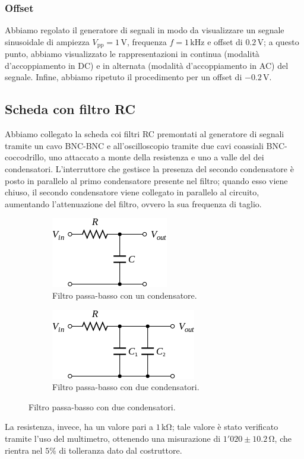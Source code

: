 \documentclass{article}
\begin{document}
			\subsubsection{Offset}
				Abbiamo regolato il generatore di segnali in modo da visualizzare un segnale sinusoidale di ampiezza $ V_{\mathrm{pp}} = 1 \, \mathrm{V} $, frequenza $ f = 1 \, \mathrm{kHz} $ e offset di $ 0.2 \, \mathrm{V} $; a questo punto, abbiamo visualizzato le rappresentazioni in continua (modalità d'accoppiamento in DC) e in alternata (modalità d'accoppiamento in AC) del segnale.
				\newline
				Infine, abbiamo ripetuto il procedimento per un offset di $ - 0.2 \, \mathrm{V} $.
		\subsection{Scheda con filtro RC}
			Abbiamo collegato la scheda coi filtri RC premontati al generatore di segnali tramite un cavo BNC-BNC e all'oscilloscopio tramite due cavi coassiali BNC-coccodrillo, uno attaccato a monte della resistenza e uno a valle del dei condensatori.
			\newline
			L'interruttore che gestisce la presenza del secondo condensatore è posto in parallelo al primo condensatore presente nel filtro; quando esso viene chiuso, il secondo condensatore viene collegato in parallelo al circuito, aumentando l'attenuazione del filtro, ovvero la sua frequenza di taglio.
			\begin{figure}[h!]
				\centering
				\begin{subfigure}{0.4\textwidth}
					\centering
					\includegraphics[scale=0.7]{filtroPassaBassoUnCondensatore}
					\caption{Filtro passa-basso con un condensatore.}
				\end{subfigure}
				\begin{subfigure}{0.4\textwidth}
					\centering
					\includegraphics[scale=0.7]{filtroPassaBassoDueCondensatori}
					\caption{Filtro passa-basso con due condensatori.}
				\end{subfigure}
				\label{fig:filtroPassaBassoCondensatori}
			\end{figure}
			\newline
			La resistenza, invece, ha un valore pari a $ 1 \, \mathrm{k\Omega} $; tale valore è stato verificato tramite l'uso del multimetro, ottenendo una misurazione di $ 1'020 \pm 10.2 \, \mathrm{\Omega} $, che rientra nel $ 5 \% $ di tolleranza dato dal costruttore.
\end{document}
